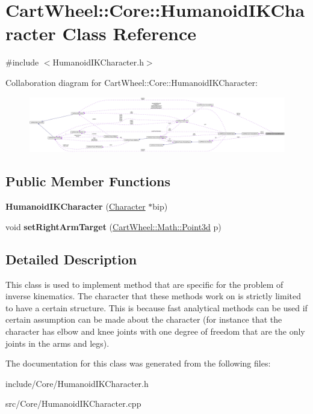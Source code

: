 \hypertarget{classCartWheel_1_1Core_1_1HumanoidIKCharacter}{
\section{CartWheel::Core::HumanoidIKCharacter Class Reference}
\label{classCartWheel_1_1Core_1_1HumanoidIKCharacter}
}


{\ttfamily \#include $<$HumanoidIKCharacter.h$>$}



Collaboration diagram for CartWheel::Core::HumanoidIKCharacter:\nopagebreak
\begin{figure}[H]
\begin{center}
\leavevmode
\includegraphics[width=400pt]{classCartWheel_1_1Core_1_1HumanoidIKCharacter__coll__graph}
\end{center}
\end{figure}
\subsection*{Public Member Functions}
\begin{DoxyCompactItemize}
\item 
\hypertarget{classCartWheel_1_1Core_1_1HumanoidIKCharacter_a9d9a5cde70eaa71c376334dbd6a560e2}{
{\bfseries HumanoidIKCharacter} (\hyperlink{classCartWheel_1_1Core_1_1Character}{Character} $\ast$bip)}
\label{classCartWheel_1_1Core_1_1HumanoidIKCharacter_a9d9a5cde70eaa71c376334dbd6a560e2}

\item 
\hypertarget{classCartWheel_1_1Core_1_1HumanoidIKCharacter_aa27d53e11a0e495d439d9b15c8b5b921}{
void {\bfseries setRightArmTarget} (\hyperlink{classCartWheel_1_1Math_1_1Point3d}{CartWheel::Math::Point3d} p)}
\label{classCartWheel_1_1Core_1_1HumanoidIKCharacter_aa27d53e11a0e495d439d9b15c8b5b921}

\end{DoxyCompactItemize}


\subsection{Detailed Description}
This class is used to implement method that are specific for the problem of inverse kinematics. The character that these methods work on is strictly limited to have a certain structure. This is because fast analytical methods can be used if certain assumption can be made about the character (for instance that the character has elbow and knee joints with one degree of freedom that are the only joints in the arms and legs). 

The documentation for this class was generated from the following files:\begin{DoxyCompactItemize}
\item 
include/Core/HumanoidIKCharacter.h\item 
src/Core/HumanoidIKCharacter.cpp\end{DoxyCompactItemize}
